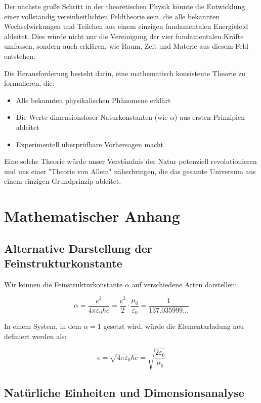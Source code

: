 \documentclass{article}
\begin{document}
	Der nächste große Schritt in der theoretischen Physik könnte die Entwicklung einer vollständig vereinheitlichten Feldtheorie sein, die alle bekannten Wechselwirkungen und Teilchen aus einem einzigen fundamentalen Energiefeld ableitet. Dies würde nicht nur die Vereinigung der vier fundamentalen Kräfte umfassen, sondern auch erklären, wie Raum, Zeit und Materie aus diesem Feld entstehen.
	
	Die Herausforderung besteht darin, eine mathematisch konsistente Theorie zu formulieren, die:
	
	\begin{itemize}
		\item Alle bekannten physikalischen Phänomene erklärt
		\item Die Werte dimensionsloser Naturkonstanten (wie $\alpha$) aus ersten Prinzipien ableitet
		\item Experimentell überprüfbare Vorhersagen macht
	\end{itemize}
	
	Eine solche Theorie würde unser Verständnis der Natur potenziell revolutionieren und uns einer "Theorie von Allem" näherbringen, die das gesamte Universum aus einem einzigen Grundprinzip ableitet.
	
	\section{Mathematischer Anhang}
	
	\subsection{Alternative Darstellung der Feinstrukturkonstante}
	
	Wir können die Feinstrukturkonstante $\alpha$ auf verschiedene Arten darstellen:
	
	\begin{equation}
		\alpha = \frac{e^2}{4\pi\varepsilon_0\hbar c} = \frac{e^2}{2} \cdot \frac{\mu_0}{\varepsilon_0} = \frac{1}{137.035999...}
	\end{equation}
	
	In einem System, in dem $\alpha = 1$ gesetzt wird, würde die Elementarladung neu definiert werden als:
	
	\begin{equation}
		e = \sqrt{4\pi\varepsilon_0\hbar c} = \sqrt{\frac{2\varepsilon_0}{\mu_0}}
	\end{equation}
	
	\subsection{Natürliche Einheiten und Dimensionsanalyse}
	
\end{document}
